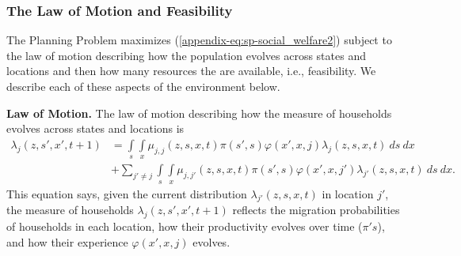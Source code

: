 \documentclass[12pt,pdftex]{article}
\begin{document}
\subsubsection{The Law of Motion and Feasibility}

The Planning Problem maximizes (\ref{appendix-eq:sp-social_welfare2}) subject to the law of motion describing how the population evolves across states and locations and then how many resources the are available, i.e., feasibility. We describe each of these aspects of the environment below.

\textbf{Law of Motion.} The law of motion describing how the measure of households evolves across states and locations is
\begin{align}
\lambda_{j}(z, s', x', t+1)  & =  \int\limits_{s} \int\limits_{x}  \mu_{j,j}(z, s,x,t)\pi(s',s) \varphi(x',x, j) \lambda_{j}(z, s, x, t)  \ ds \ dx  \  \label{appendix-eq:planner_law_motion} \\
& +  \sum_{j' \neq j} \int\limits_{s} \int\limits_{x} \mu_{j,j'}(z, s,x,t) \pi(s',s) \varphi(x',x, j') \lambda_{j'}(z, s, x, t)  \ ds  \ dx. \nonumber
\end{align}
This equation says, given the current distribution $\lambda_{j'}(z, s, x, t)$ in location $j'$, the measure of households $\lambda_{j}(z, s', x', t+1)$ reflects the migration probabilities of households in each location, how their productivity evolves over time ($\pi's$), and how their experience $\varphi(x',x, j)$ evolves.
\end{document}
